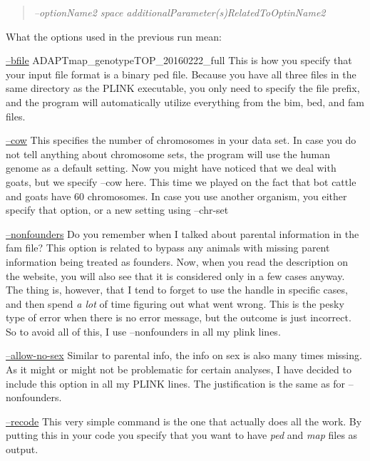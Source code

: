 \documentclass[]{book}
\begin{document}
\begin{quote}
\emph{--optionName2 space additionalParameter(s)RelatedToOptinName2}
\end{quote}

What the options used in the previous run mean:

\href{https://www.cog-genomics.org/plink/1.9/input\#bed}{--bfile}
ADAPTmap\_genotypeTOP\_20160222\_full This is how you specify that your
input file format is a binary ped file. Because you have all three files
in the same directory as the PLINK executable, you only need to specify
the file prefix, and the program will automatically utilize everything
from the bim, bed, and fam files.

\href{https://www.cog-genomics.org/plink/1.9/input\#chr_set}{--cow} This
specifies the number of chromosomes in your data set. In case you do not
tell anything about chromosome sets, the program will use the human
genome as a default setting. Now you might have noticed that we deal
with goats, but we specify --cow here. This time we played on the fact
that bot cattle and goats have 60 chromosomes. In case you use another
organism, you either specify that option, or a new setting using
--chr-set

\href{https://www.cog-genomics.org/plink/1.9/filter\#nonfounders}{--nonfounders}
Do you remember when I talked about parental information in the fam
file? This option is related to bypass any animals with missing parent
information being treated as founders. Now, when you read the
description on the website, you will also see that it is considered only
in a few cases anyway. The thing is, however, that I tend to forget to
use the handle in specific cases, and then spend \emph{a lot} of time
figuring out what went wrong. This is the pesky type of error when there
is no error message, but the outcome is just incorrect. So to avoid all
of this, I use --nonfounders in all my plink lines.

\href{https://www.cog-genomics.org/plink/1.9/filter\#allow_no_sex}{--allow-no-sex}
Similar to parental info, the info on sex is also many times missing. As
it might or might not be problematic for certain analyses, I have
decided to include this option in all my PLINK lines. The justification
is the same as for --nonfounders.

\href{https://www.cog-genomics.org/plink/1.9/data\#recode}{--recode}
This very simple command is the one that actually does all the work. By
putting this in your code you specify that you want to have \emph{ped}
and \emph{map} files as output.
\end{document}
